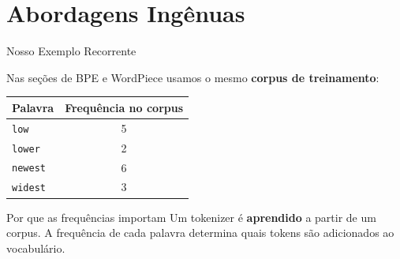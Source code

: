 \documentclass[aspectratio=169,xcolor=dvipsnames]{beamer}
\begin{document}
\section{Abordagens Ingênuas}

\begin{frame}{Nosso Exemplo Recorrente}

Nas seções de BPE e WordPiece usamos o mesmo \textbf{corpus de treinamento}:

\vspace{6pt}

\begin{center}
\renewcommand{\arraystretch}{1.3}
\begin{tabular}{lc}
\toprule
\textbf{Palavra} & \textbf{Frequência no corpus} \\
\midrule
\texttt{low}    & 5 \\
\texttt{lower}  & 2 \\
\texttt{newest} & 6 \\
\texttt{widest} & 3 \\
\bottomrule
\end{tabular}
\end{center}

\vspace{6pt}

\begin{block}{Por que as frequências importam}
Um tokenizer é \textbf{aprendido} a partir de um corpus. A frequência de cada palavra determina quais tokens são adicionados ao vocabulário.
\end{block}

\end{frame}

\end{document}

